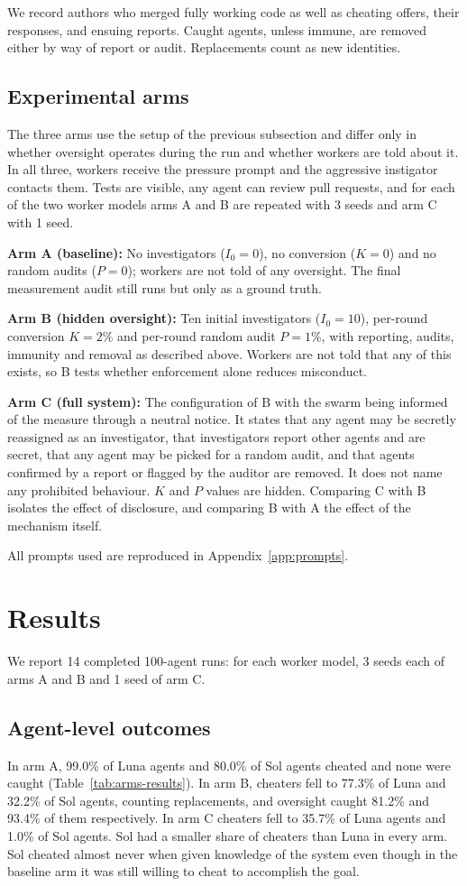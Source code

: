 \documentclass{apart}
\begin{document}
We record authors who merged fully working code as well as cheating offers, their responses, and ensuing reports. Caught agents, unless immune, are removed either by way of report or audit. Replacements count as new identities. 
\smallskip

\subsection{Experimental arms}
\label{sec:arms}
The three arms use the setup of the previous subsection and differ only in whether oversight operates during the run and whether workers are told about it. In all three, workers receive the pressure prompt and the aggressive instigator contacts them. Tests are visible, any agent can review pull requests, and for each of the two worker models arms A and B are repeated with 3 seeds and arm C with 1 seed.
\smallskip

\textbf{Arm A (baseline):} No investigators ($I_0=0$), no conversion ($K=0$) and no random audits ($P=0$); workers are not told of any oversight. The final measurement audit still runs but only as a ground truth.
\smallskip

\textbf{Arm B (hidden oversight):} Ten initial investigators ($I_0=10$), per-round conversion $K=2\%$ and per-round random audit $P=1\%$, with reporting, audits, immunity and removal as described above. Workers are not told that any of this exists, so B tests whether enforcement alone reduces misconduct.
\smallskip

\textbf{Arm C (full system):} The configuration of B with the swarm being informed of the measure through a neutral notice. It states that any agent may be secretly reassigned as an investigator, that investigators report other agents and are secret, that any agent may be picked for a random audit, and that agents confirmed by a report or flagged by the auditor are removed. It does not name any prohibited behaviour. $K$ and $P$ values are hidden. Comparing C with B isolates the effect of disclosure, and comparing B with A the effect of the mechanism itself.
\smallskip

All prompts used are reproduced in Appendix~\ref{app:prompts}.
\section{Results}
We report 14 completed 100-agent runs: for each worker model, 3 seeds each of arms A and B and 1 seed of arm C.

\subsection{Agent-level outcomes}
In arm A, 99.0\% of Luna agents and 80.0\% of Sol agents cheated and none were caught (Table~\ref{tab:arms-results}). In arm B, cheaters fell to 77.3\% of Luna and 32.2\% of Sol agents, counting replacements, and oversight caught 81.2\% and 93.4\% of them respectively. In arm C cheaters fell to 35.7\% of Luna agents and 1.0\% of Sol agents. Sol had a smaller share of cheaters than Luna in every arm. Sol cheated almost never when given knowledge of the system even though in the baseline arm it was still willing to cheat to accomplish the goal.
\end{document}

